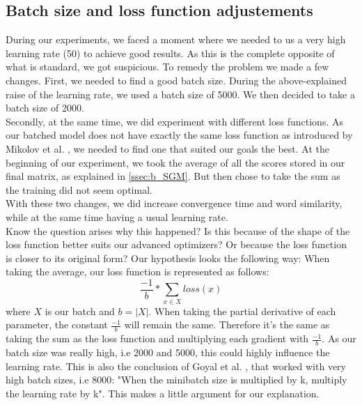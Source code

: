 \subsection{Batch size and loss function adjustements}\label{ssec:bs_lf}
During our experiments, we faced a moment where we needed to us a very high learning rate (50) to achieve good results. As this is the complete opposite of what is standard, we got suspicious. To remedy the problem we made a few changes. 
First, we needed to find a good batch size. During the above-explained raise of the learning rate, we used a batch size of 5000. We then decided to take a batch size of 2000.\\
 Secondly, at the same time, we did experiment with different loss functions. As our batched model does not have exactly the same loss function as introduced by Mikolov et al. \cite{mikolov}, we needed to find one that suited our goals the best. At the beginning of our experiment, we took the average of all the scores stored in our final matrix, as explained in \ref{ssec:b_SGM}. But then chose to take the sum as the training did not seem optimal.\\ 
 With these two changes, we did increase convergence time and word similarity, while at the same time having a usual learning rate. \\
 Know the question arises why this happened? Is this because of the shape of the loss function better suits our advanced optimizers? Or because the loss function is closer to its original form? Our hypothesis looks the following way: 
 When taking the average, our loss function is represented as follows:
 \begin{equation}
 \frac{-1}{b }* \sum_{x\in X} loss(x)
 \end{equation}
where $X$ is our batch and $b = |X|$. 
When taking the partial derivative of each parameter, the constant $ \frac{-1}{b }$ will remain the same. Therefore it's the same as taking the sum as the loss function and multiplying each gradient with $\frac{-1}{b }$. As our batch size was really high, i.e 2000 and 5000, this could highly influence the learning rate. This is also the conclusion of Goyal et al. \cite{fb}, that worked with very high batch sizes, i.e 8000: "When the minibatch size is multiplied by k, multiply the learning rate by k". This makes a little argument for our explanation.


